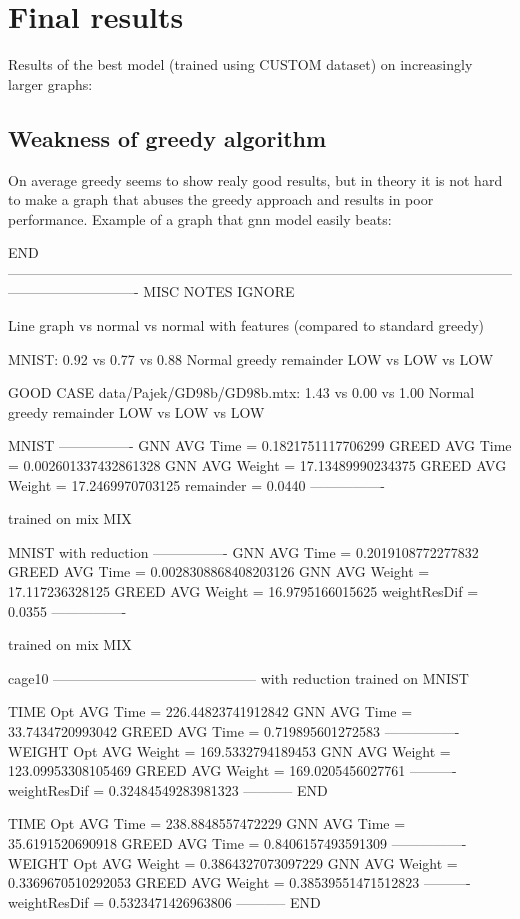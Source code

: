 \section{Final results}

Results of the best model (trained using CUSTOM dataset) on increasingly larger graphs:



\subsection{Weakness of greedy algorithm}

On average greedy seems to show realy good results, but in theory it is not hard to make a graph that abuses the greedy approach and results in poor performance. Example of a graph that \gls{gnn} model easily beats:

END
----------------------------------------------------------------------------------------------------------------------------------------
MISC NOTES IGNORE

Line graph vs normal vs normal with features (compared to standard greedy)

MNIST:
0.92 vs  0.77 vs  0.88 
Normal greedy remainder
LOW vs LOW vs LOW 

GOOD CASE data/Pajek/GD98b/GD98b.mtx:
1.43 vs  0.00 vs 1.00
Normal greedy remainder
LOW vs LOW vs LOW

MNIST 
----------------
GNN AVG Time =  0.1821751117706299
GREED AVG Time =  0.002601337432861328
GNN AVG Weight =  17.13489990234375
GREED AVG Weight =  17.2469970703125
remainder =  0.0440
----------------

trained on mix MIX


MNIST with reduction
----------------
GNN AVG Time =  0.2019108772277832
GREED AVG Time =  0.0028308868408203126
GNN AVG Weight =  17.117236328125
GREED AVG Weight =  16.9795166015625
weightResDif =  0.0355
----------------

trained on mix MIX

cage10 
--------------------------------------------
with reduction trained on MNIST

TIME
Opt AVG Time =  226.44823741912842
GNN AVG Time =  33.7434720993042
GREED AVG Time =  0.719895601272583
----------------
WEIGHT
Opt AVG Weight =  169.5332794189453
GNN AVG Weight =  123.09953308105469
GREED AVG Weight =  169.0205456027761
----------
weightResDif =  0.32484549283981323
-----------
END

TIME
Opt AVG Time =  238.8848557472229
GNN AVG Time =  35.6191520690918
GREED AVG Time =  0.8406157493591309
----------------
WEIGHT
Opt AVG Weight =  0.3864327073097229
GNN AVG Weight =  0.3369670510292053
GREED AVG Weight =  0.38539551471512823
----------
weightResDif =  0.5323471426963806
-----------
END

